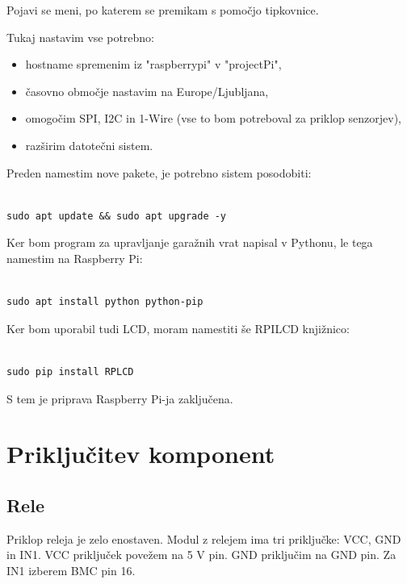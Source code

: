 \documentclass[11pt]{article}
\begin{document}
Pojavi se meni, po katerem se premikam s pomočjo tipkovnice.

Tukaj nastavim vse potrebno:
\begin{itemize}
    \item hostname spremenim iz "raspberrypi" v "projectPi",
    \item časovno območje nastavim na Europe/Ljubljana,
    \item omogočim SPI, I2C in 1-Wire (vse to bom potreboval za priklop senzorjev),
    \item razširim datotečni sistem.
\end{itemize}

Preden namestim nove pakete, je potrebno sistem posodobiti:

\begin{verbatim}

sudo apt update && sudo apt upgrade -y
\end{verbatim}

Ker bom program za upravljanje garažnih vrat napisal v Pythonu, le tega namestim na Raspberry Pi:
\begin{verbatim}

sudo apt install python python-pip
\end{verbatim}

Ker bom uporabil tudi LCD, moram namestiti še RPILCD knjižnico:

\begin{verbatim}

sudo pip install RPLCD
\end{verbatim}

S tem je priprava Raspberry Pi-ja zaključena.

\section{Priključitev komponent}
\subsection{Rele}
Priklop releja je zelo enostaven. Modul z relejem ima tri priključke: VCC, GND in IN1. VCC priključek povežem na 5 V pin. GND priključim na GND pin. Za IN1 izberem BMC pin 16.
\end{document}
